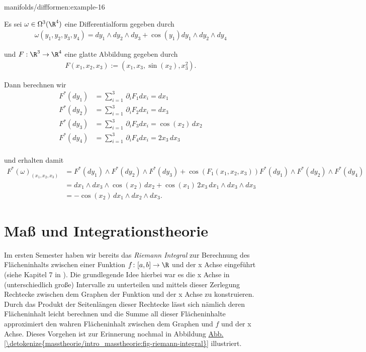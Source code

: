 \documentclass[letterpaper,10pt,german]{jupyterBook}
\begin{document}
\begin{example}{}{manifolds/diffformen:example-16}



\par
Es sei \(\omega\in \Omega^3(\R^4)\) eine Differentialform gegeben durch
\begin{align*}
\omega(y_1,y_2,y_3,y_4) = dy_1\wedge dy_2\wedge dy_3 + \cos(y_1)dy_1\wedge dy_2 \wedge dy_4
\end{align*}
\par
und \(F:\R^3\to\R^4\) eine glatte Abbildung gegeben durch
\begin{align*}
F(x_1,x_2,x_3) := (x_1, x_3, \sin(x_2), x_3^2).
\end{align*}
\par
Dann berechnen wir
\begin{align*}
F^\ast(dy_1) &= \sum_{i=1}^3 \,\partial_i F_1 dx_i = dx_1\\
F^\ast(dy_2) &= \sum_{i=1}^3 \,\partial_i F_2 dx_i = dx_3\\
F^\ast(dy_3) &= \sum_{i=1}^3 \,\partial_i F_3 dx_i = \cos(x_2)\,dx_2\\
F^\ast(dy_4) &= \sum_{i=1}^3 \,\partial_i F_4 dx_i = 2x_3\,dx_3\\
\end{align*}
\par
und erhalten damit
\begin{align*}
F^\ast(\omega)_{(x_1,x_2,x_3)} &= F^\ast(dy_1)\wedge F^\ast(dy_2)\wedge F^\ast(dy_3) + 
\cos(F_1(x_1,x_2,x_3)) F^\ast(dy_1)\wedge F^\ast(dy_2)\wedge F^\ast(dy_4)\\
&= dx_1 \wedge dx_3\wedge \cos(x_2)\,dx_2 + \cos(x_1)\, 2x_3\,dx_1\wedge dx_3\wedge dx_3\\
&=  -\cos(x_2)\,dx_1 \wedge dx_2\wedge dx_3.
\end{align*}\end{example}


\chapter{Maß  und Integrationstheorie}
\label{\detokenize{masstheorie/intro_masstheorie:masz-und-integrationstheorie}}\label{\detokenize{masstheorie/intro_masstheorie::doc}}
\par
Im ersten Semester haben wir bereits das \emph{Riemann Integral} zur Berechnung des Flächeninhalts zwischen einer Funktion \(f \colon [a,b] \rightarrow \R\) und der x Achse eingeführt (siehe Kapitel 7 in \cite{Bur20}).
Die grundlegende Idee hierbei war es die x Achse in (unterschiedlich große) Intervalle zu unterteilen und mittels dieser Zerlegung Rechtecke zwischen dem Graphen der Funktion und der x Achse zu konstruieren.
Durch das Produkt der Seitenlängen dieser Rechtecke lässt sich nämlich deren Flächeninhalt leicht berechnen und die Summe all dieser Flächeninhalte approximiert den wahren Flächeninhalt zwischen dem Graphen und \(f\) und der x Achse.
Dieses Vorgehen ist zur Erinnerung nochmal in Abbildung \hyperref[\detokenize{masstheorie/intro_masstheorie:fig-riemann-integral}]{Abb.\@ \ref{\detokenize{masstheorie/intro_masstheorie:fig-riemann-integral}}} illustriert.
\end{document}
